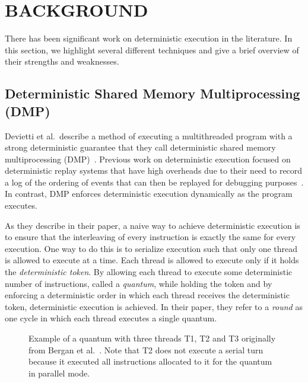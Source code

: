 \chapter{BACKGROUND}
\label{BACKGROUND}

There has been significant work on deterministic execution in the
literature.  In this section, we highlight several different
techniques and give a brief overview of their strengths and
weaknesses.

\section{Deterministic Shared Memory Multiprocessing (DMP)}

Devietti et al.\ describe a method of executing a multithreaded
program with a strong deterministic guarantee that they call
deterministic shared memory multiprocessing (DMP)~\cite{dmp}.
Previous work on deterministic execution focused on deterministic
replay systems that have high overheads due to their need to record a
log of the ordering of events that can then be replayed for debugging
purposes~\cite{recplay}.  In contrast, DMP enforces deterministic
execution dynamically as the program executes.

As they describe in their paper, a naive way to achieve deterministic
execution is to ensure that the interleaving of every instruction is
exactly the same for every execution.  One way to do this is to
serialize execution such that only one thread is allowed to execute at
a time.  Each thread is allowed to execute only if it holds the
\emph{deterministic token}.  By allowing each thread to execute some
deterministic number of instructions, called a \emph{quantum}, while
holding the token and by enforcing a deterministic order in which each
thread receives the deterministic token, deterministic execution is
achieved.  In their paper, they refer to a \emph{round} as one cycle
in which each thread executes a single quantum.

\begin{figure}[!]
  \begin{center}
    {}
  \end{center}
  \caption{Example of a quantum with three threads T1, T2 and T3
    originally from Bergan et al.~\cite{coredet}.  Note that T2 does
    not execute a serial turn because it executed all instructions
    allocated to it for the quantum in parallel mode.}
  \label{fig:quantum}
\end{figure}

